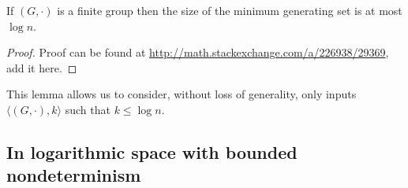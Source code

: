 \documentclass{article}
\begin{document}
\begin{lemma}\label{lem:log}
  If $(G, \cdot)$ is a finite group then the size of the minimum generating set is at most $\log n$.
\end{lemma}
\begin{proof}
  Proof can be found at \url{http://math.stackexchange.com/a/226938/29369}, add it here.
\end{proof}

This lemma allows us to consider, without loss of generality, only inputs $\langle (G, \cdot), k \rangle$ such that $k \leq \log n$.

\subsection{In logarithmic space with bounded nondeterminism}
\end{document}
